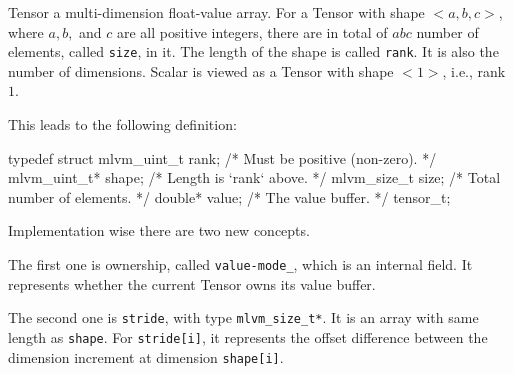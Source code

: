 
\baselineskip

\noindent Tensor a multi-dimension float-value array. For a Tensor with shape $<a, b, c>$,
where $a,b,$ and $c$ are all positive integers, there are in total of $ a b c $
number of elements, called {\tt size}, in it. The length of the shape is called
{\tt rank}. It is also the number of dimensions. Scalar is viewed as a Tensor
with shape $<1>$, i.e., rank $1$.

\noindent This leads to the following definition:

\begtt
typedef struct {
  mlvm_uint_t  rank;   /* Must be positive (non-zero). */
  mlvm_uint_t* shape;  /* Length is `rank` above. */
  mlvm_size_t  size;   /* Total number of elements. */
  double*      value;  /* The value buffer. */
} tensor_t;
\endtt

\noindent Implementation wise there are two new concepts.

{\narrower
{}\quad The first one is ownership, called {\tt value-mode\_}, which
is an internal field. It represents whether the current Tensor owns its value
buffer.

\quad The second one is {\tt stride}, with type {\tt mlvm\_size\_t*}.
It is an array with same length as {\tt shape}. For {\tt stride[i]}, it
represents the offset difference between the dimension increment at dimension
{\tt shape[i]}.
\par}

\bye

